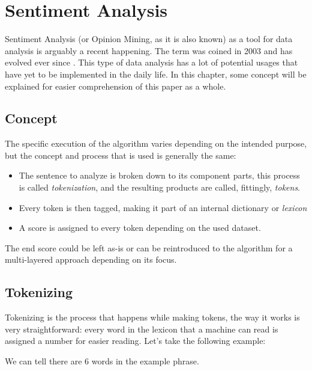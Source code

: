 \chapter{Sentiment Analysis}
Sentiment Analysis (or Opinion Mining, as it is also known) as a tool for data analysis is arguably a recent happening. The term was coined in 2003 and has evolved ever since \citep{rf3}.
This type of data analysis has a lot of potential usages that have yet to be implemented in the daily life.
In this chapter, some concept will be explained for easier comprehension of this paper as a whole.

\section{Concept}
The specific execution of the algorithm varies depending on the intended purpose, but the concept and process that is used is generally the same:
\begin{itemize}
	\item The sentence to analyze is broken down to its component parts, this process is called \textit{tokenization}, and the resulting products are called, fittingly, \textit{tokens}.
	\item Every token is then tagged, making it part of an internal dictionary or \textit{lexicon}
	\item A score is assigned to every token depending on the used dataset.
\end{itemize}
The end score could be left as-is or can be reintroduced to the algorithm for a multi-layered approach depending on its focus. \citep{rf4}

\section{Tokenizing}
Tokenizing is the process that happens while making tokens, the way it works is very straightforward: every word in the lexicon that a machine can read is assigned a number for easier reading. Let's take the following example:
\begin{center}
\end{center}

We can tell there are 6 words in the example phrase.

